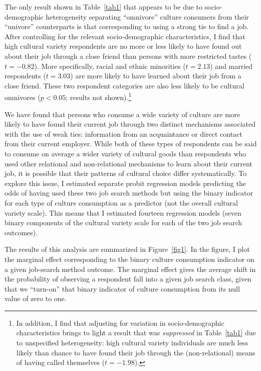 \documentclass[12pt]{article}
\begin{document}
The only result shown in Table~\ref{tab1} that appears to be due to socio-demographic heterogeneity separating ``omnivore'' culture consumers from their ``univore'' counterparts is that corresponding to using a strong tie to find a job.  After controlling for the relevant socio-demographic characteristics, I find that high cultural variety respondents are no more or less likely to have found out about their job through a close friend than persons with more restricted tastes ($t=-0.82$). More specifically, racial and ethnic minorities ($t=2.13$) and married respondents ($t=3.03$) are more likely to have learned about their job from a close friend.  These two respondent categories are also less likely to be cultural omnivores ($p<0.05$; results not shown).\footnote{In addition, I find that adjusting for variation in socio-demographic characteristics brings to light a result that was {\em suppressed} in Table~\ref{tab1} due to unspecified heterogeneity:  high cultural variety individuals are much less likely than chance to have found their job through the (non-relational) means of having called themselves ($t=-1.98$).}

We have found that persons who consume a wide variety of culture are more likely to have found their current job through two distinct mechanisms associated with the use of weak ties:  information from an acquaintance or direct contact from their current employer.  While both of these types of respondents can be said to consume on average a wider variety of cultural goods than respondents who used other relational and non-relational mechanisms to learn about their current job, it is possible that their patterns of cultural choice differ systematically.  To explore this issue, I estimated separate probit regression models predicting the odds of having used these two job search methods but using the binary indicator for each type of culture consumption as a predictor (not the overall cultural variety scale).  This means that I estimated fourteen regression models (seven binary components of the cultural variety scale for each of the two job search outcomes).

The results of this analysis are summarized in Figure~\ref{fig1}.  In the figure, I plot the marginal effect \citep[126]{long_freese06} corresponding to the binary culture consumption indicator on a given job-search method outcome.  The marginal effect gives the average shift in the probability of observing a respondent fall into a given job search class, given that we ``turn-on'' that binary indicator of culture consumption from its null value of zero to one. 
\end{document}
